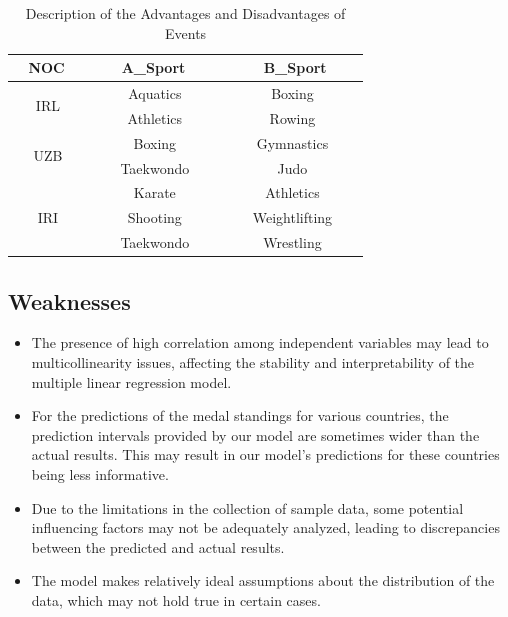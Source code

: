 \documentclass{mcmthesis}
\begin{document}
\begin{table}
\centering
\caption{Description of the Advantages and Disadvantages of Events}
\begin{tabular}{|c|c|c|} 
\hline
\textbf{~ NOC~~}     & \textbf{~ ~ A\_Sport~ ~~} & \textbf{~ ~ ~B\_Sport~ ~~}  \\ 
\hline
\multirow{2}{*}{IRL} & Aquatics                  & Boxing                      \\ 
\cline{2-3}
                     & Athletics                 & Rowing                      \\ 
\hline
\multirow{2}{*}{UZB} & Boxing                    & Gymnastics                  \\ 
\cline{2-3}
                     & Taekwondo                 & Judo                        \\ 
\hline
\multirow{3}{*}{IRI} & Karate                    & Athletics                   \\ 
\cline{2-3}
                     & Shooting                  & Weightlifting               \\ 
\cline{2-3}
                     & Taekwondo                 & Wrestling                   \\
\hline
\end{tabular}
\end{table}

\subsection{Weaknesses}

\begin{itemize}
\item The presence of high correlation among independent variables may lead to multicollinearity issues, affecting the stability and interpretability of the multiple linear regression model.

\item For the predictions of the medal standings for various countries, the prediction intervals provided by our model are sometimes wider than the actual results. This may result in our model's predictions for these countries being less informative.

\item Due to the limitations in the collection of sample data, some potential influencing factors may not be adequately analyzed, leading to discrepancies between the predicted and actual results.

\item The model makes relatively ideal assumptions about the distribution of the data, which may not hold true in certain cases.
\end{itemize}
\end{document}
